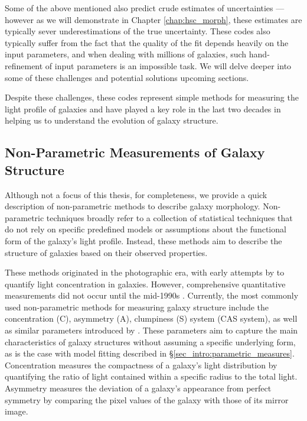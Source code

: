 Some of the above mentioned also predict crude estimates of uncertainties --- however as we will demonstrate in Chapter \ref{chap:hsc_morph}, these estimates are typically sever underestimations of the true uncertainty. These codes also typically suffer from the fact that the quality of the fit depends heavily on the input parameters, and when dealing with millions of galaxies, such hand-refinement of input parameters is an impossible task. We will delve deeper into some of these challenges and potential solutions upcoming sections. 

Despite these challenges, these codes represent simple methods for measuring the light profile of galaxies and have played a key role in the last two decades in helping us to understand the evolution of galaxy structure.

\subsection{Non-Parametric Measurements of Galaxy Structure} \label{sec_intro:non_parametric_measures}

Although not a focus of this thesis, for completeness, we provide a quick description of non-parametric methods to describe galaxy morphology. Non-parametric techniques broadly refer to a collection of statistical techniques that do not rely on specific predefined models or assumptions about the functional form of the galaxy's light profile. Instead, these methods aim to describe the structure of galaxies based on their observed properties.

These methods  originated in the photographic era, with early attempts by \citet{morgan_62} to quantify light concentration in galaxies. However, comprehensive quantitative measurements did not occur until the mid-1990s \citep{rix_95,conselice_97}. Currently, the most commonly used non-parametric methods for measuring galaxy structure include the concentration (C), asymmetry (A), clumpiness (S) system (CAS system), as well as similar parameters introduced by \citet{takamiya_99, papovich_03, abraham_03, lotz_04}. These parameters aim to capture the main characteristics of galaxy structures without assuming a specific underlying form, as is the case with model fitting described in \S \ref{sec_intro:parametric_measures}. Concentration measures the compactness of a galaxy's light distribution by quantifying the ratio of light contained within a specific radius to the total light. Asymmetry measures the deviation of a galaxy's appearance from perfect symmetry by comparing the pixel values of the galaxy with those of its mirror image.

